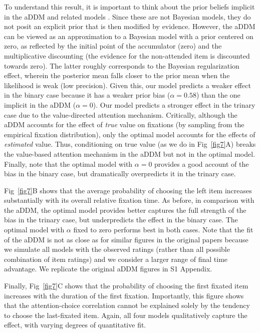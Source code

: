 To understand this result, it is important to think about the prior beliefs implicit in the aDDM and related models \citep{krajbich2010visual,krajbich2011multialternative,gluth2020valuebased}. Since these are not Bayesian models, they do not posit an explicit prior that is then modified by evidence. However, the aDDM can be viewed as an approximation to a Bayesian model with a prior centered on zero, as reflected by the initial point of the accumulator (zero) and the multiplicative discounting (the evidence for the non-attended item is discounted towards zero). The latter roughly corresponds to the Bayesian regularization effect, wherein the posterior mean falls closer to the prior mean when the likelihood is weak (low precision). Given this, our model predicts a weaker effect in the binary case because it has a weaker prior bias ($\alpha = 0.58$) than the one implicit in the aDDM ($\alpha = 0$). Our model predicts a stronger effect in the trinary case due to the value-directed attention mechanism. Critically, although the aDDM accounts for the effect of \emph{true} value on fixations (by sampling from the empirical fixation distribution), only the optimal model accounts for the effects of \emph{estimated} value. Thus, conditioning on true value (as we do in Fig~\ref{fig7}A) breaks the value-based attention mechanism in the aDDM but not in the optimal model. Finally, note that the optimal model with $\alpha = 0$ provides a good account of the bias in the binary case, but dramatically overpredicts it in the trinary case.

Fig~\ref{fig7}B shows that the average probability of choosing the left item increases substantially with its overall relative fixation time. As before, in comparison with the aDDM, the optimal model provides better captures the full strength of the bias in the trinary case, but underpredicts the effect in the binary case. The optimal model with $\alpha$ fixed to zero performs best in both cases. Note that the fit of the aDDM is not as close as for similar figures in the original papers because we simulate all models with the observed ratings (rather than all possible combination of item ratings) and we consider a larger range of final time advantage. We replicate the original aDDM figures in S1 Appendix. 

Finally, Fig~\ref{fig7}C shows that the probability of choosing the first fixated item increases with the duration of the first fixation. Importantly, this figure shows that the attention-choice correlation cannot be explained solely by the tendency to choose the last-fixated item. Again, all four models qualitatively capture the effect, with varying degrees of quantitative fit.
 

